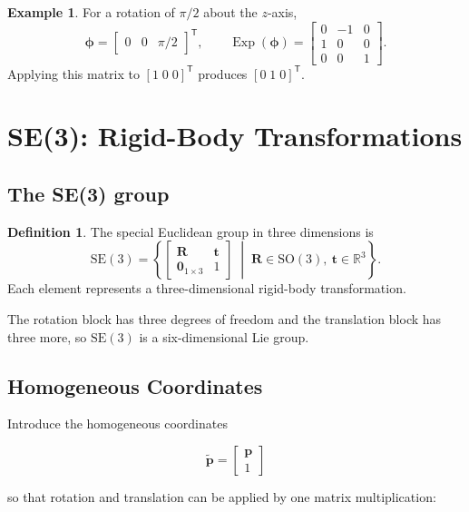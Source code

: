 \documentclass[10pt,a4paper]{article}
\numberwithin{equation}{section}
\newcommand{\Section}[1]{\section{#1}}
\newcommand{\Subsection}[1]{\subsection{#1}}
\newcommand{\SOthree}{\mathrm{SO}(3)}
\newcommand{\SEthree}{\mathrm{SE}(3)}
\newcommand{\Exp}{\operatorname{Exp}}
\newcommand{\vect}[1]{\boldsymbol{#1}}
\theoremstyle{definition}
\newtheorem{definition}{Definition}[section]
\newtheorem{example}{Example}[section]
\theoremstyle{exercisestyle}
\begin{document}
\begin{example}
    For a rotation of $\pi/2$ about the $z$-axis,
    \begin{equation}
        \vect{\phi}=\begin{bmatrix}0&0&\pi/2\end{bmatrix}^{\mathsf T},
        \qquad
        \Exp(\vect{\phi})=
        \begin{bmatrix}0&-1&0\\1&0&0\\0&0&1\end{bmatrix}.
    \end{equation}
    Applying this matrix to $[1\;0\;0]^{\mathsf T}$ produces
    $[0\;1\;0]^{\mathsf T}$.
\end{example}

\Section{SE(3): Rigid-Body Transformations}

\Subsection{The SE(3) group}

\begin{definition}
    The special Euclidean group in three dimensions is
    \begin{equation}
        \SEthree=
        \left\{
        \begin{bmatrix}\mathbf{R}            & \mathbf{t} \\
               \mathbf{0}_{1\times3} & 1\end{bmatrix}
        \;\middle|\;
        \mathbf{R}\in\SOthree,\ \mathbf{t}\in\mathbb{R}^3
        \right\}.
        \label{eq:se3-definition}
    \end{equation}
    Each element represents a three-dimensional rigid-body transformation.
\end{definition}

The rotation block has three degrees of freedom and the translation block has
three more, so $\SEthree$ is a six-dimensional Lie group.

\Subsection{Homogeneous Coordinates}

Introduce the homogeneous coordinates

\begin{equation}
    \widetilde{\mathbf{p}} = \begin{bmatrix}
        \mathbf{p} \\
        1
    \end{bmatrix}
\end{equation}

so that rotation and translation can be applied by one matrix multiplication:
\end{document}
